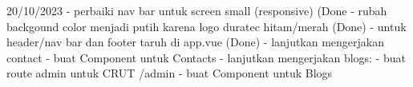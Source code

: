 20/10/2023
    - perbaiki nav bar untuk screen small (responsive) (Done
    - rubah backgound color menjadi putih karena logo duratec hitam/merah (Done)
    - untuk header/nav bar dan footer taruh di app.vue (Done)
    - lanjutkan mengerjakan contact
         - buat Component untuk Contacts
    - lanjutkan mengerjakan blogs:
        - buat route admin untuk CRUT   /admin
        - buat Component untuk Blogs
    
